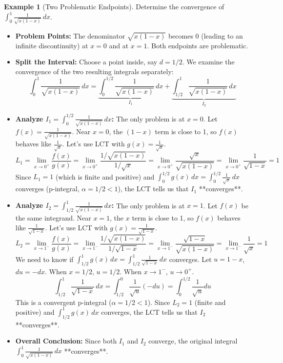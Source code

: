 \documentclass[11pt]{article}
\theoremstyle{definition}
\newtheorem{example}[theorem]{Example}
\newcommand{\dx}{\, dx} %
\begin{document}
\begin{example}[Two Problematic Endpoints] \label{ex:sqrt_x_1-x}
    Determine the convergence of $\int_0^1 \frac{1}{\sqrt{x(1-x)}} \dx$.
    \begin{itemize}
        \item \textbf{Problem Points:} The denominator $\sqrt{x(1-x)}$ becomes 0 (leading to an infinite discontinuity) at $x=0$ and at $x=1$. Both endpoints are problematic.
        \item \textbf{Split the Interval:} Choose a point inside, say $d=1/2$. We examine the convergence of the two resulting integrals separately:
          \[
          \int_0^1 \frac{1}{\sqrt{x(1-x)}} \dx = \underbrace{\int_0^{1/2} \frac{1}{\sqrt{x(1-x)}} \dx}_{I_1} + \underbrace{\int_{1/2}^1 \frac{1}{\sqrt{x(1-x)}} \dx}_{I_2}
          \]
        \item \textbf{Analyze $I_1 = \int_0^{1/2} \frac{1}{\sqrt{x(1-x)}} \dx$:} The only problem is at $x=0$. Let $f(x) = \frac{1}{\sqrt{x(1-x)}}$. Near $x=0$, the $(1-x)$ term is close to 1, so $f(x)$ behaves like $\frac{1}{\sqrt{x}}$. Let's use LCT with $g(x) = \frac{1}{\sqrt{x}}$.
          \[
          L_1 = \lim_{x \to 0^+} \frac{f(x)}{g(x)} = \lim_{x \to 0^+} \frac{1/\sqrt{x(1-x)}}{1/\sqrt{x}} = \lim_{x \to 0^+} \frac{\sqrt{x}}{\sqrt{x(1-x)}} = \lim_{x \to 0^+} \frac{1}{\sqrt{1-x}} = 1
          \]
          Since $L_1 = 1$ (which is finite and positive) and $\int_0^{1/2} g(x) \dx = \int_0^{1/2} \frac{1}{\sqrt{x}} \dx$ converges (p-integral, $\alpha=1/2 < 1$), the LCT tells us that $I_1$ **converges**.
        \item \textbf{Analyze $I_2 = \int_{1/2}^1 \frac{1}{\sqrt{x(1-x)}} \dx$:} The only problem is at $x=1$. Let $f(x)$ be the same integrand. Near $x=1$, the $x$ term is close to 1, so $f(x)$ behaves like $\frac{1}{\sqrt{1-x}}$. Let's use LCT with $g(x) = \frac{1}{\sqrt{1-x}}$.
          \[
          L_2 = \lim_{x \to 1^-} \frac{f(x)}{g(x)} = \lim_{x \to 1^-} \frac{1/\sqrt{x(1-x)}}{1/\sqrt{1-x}} = \lim_{x \to 1^-} \frac{\sqrt{1-x}}{\sqrt{x(1-x)}} = \lim_{x \to 1^-} \frac{1}{\sqrt{x}} = 1
          \]
          We need to know if $\int_{1/2}^1 g(x) \dx = \int_{1/2}^1 \frac{1}{\sqrt{1-x}} \dx$ converges. Let $u=1-x$, $du=-dx$. When $x=1/2$, $u=1/2$. When $x \to 1^-$, $u \to 0^+$.
          \[ \int_{1/2}^1 \frac{1}{\sqrt{1-x}} \dx = \int_{1/2}^0 \frac{1}{\sqrt{u}} (-du) = \int_0^{1/2} \frac{1}{\sqrt{u}} du \]
          This is a convergent p-integral ($\alpha=1/2 < 1$). Since $L_2 = 1$ (finite and positive) and $\int_{1/2}^1 g(x) \dx$ converges, the LCT tells us that $I_2$ **converges**.
        \item \textbf{Overall Conclusion:} Since both $I_1$ and $I_2$ converge, the original integral $\int_0^1 \frac{1}{\sqrt{x(1-x)}} \dx$ **converges**.
    \end{itemize}
\end{example}
\end{document}

